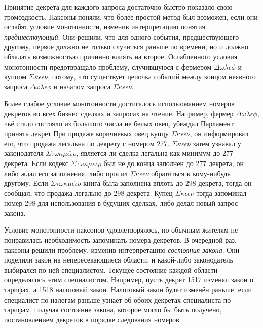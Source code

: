 \documentclass[12pt, a4paper]{article} %
\begin{document}
Принятие декрета для каждого запроса достаточно быстро показало свою громоздкость. Паксоны поняли, что более простой метод был возможен, если они ослабят условие монотонности, изменив интерпретацию понятия \textit{предшествующий}. Они решили, что для одного события, предшествующего другому, первое должно не только случиться раньше по времени, но и должно обладать возможностью причинно влиять на второе. Ослабленного условия монотонности предотвращало проблему, случившуюся с фермером $\Delta\omega\lambda\epsilon\phi$ и купцом $\Sigma\kappa\epsilon\epsilon\nu$, потому, что существует цепочка событий между концом неявного запроса $\Delta\omega\lambda\epsilon\phi$ и началом запроса $\Sigma\kappa\epsilon\epsilon\nu$. 

Более слабое условие монотонности достигалось использованием номеров декретов во всех бизнес сделках и запросах на чтение. Например, фермер $\Delta\omega\lambda\epsilon\phi$, чьё стадо состояло из большого числа не белых овец, убеждал Парламент принять декрет
При продаже коричневых овец купцу $\Sigma\kappa\epsilon\epsilon\nu$, он информировал его, что продажа легальна по декрету с номером 277. $\Sigma\kappa\epsilon\epsilon\nu$ затем узнавал у законодателя $\Sigma\tau\omega\kappa\mu\epsilon\check{\iota}\rho$, является ли сделка легальна как минимум до 277 декрета. Если кодекс $\Sigma\tau\omega\kappa\mu\epsilon\check{\iota}\rho$ был не до конца заполнен до 277 декрета, он либо ждал его заполнения, либо просил  $\Sigma\kappa\epsilon\epsilon\nu$ обратиться к кому-нибудь другому. Если  $\Sigma\tau\omega\kappa\mu\epsilon\check{\iota}\rho$ книга была заполнена вплоть до 298 декрета, тогда он сообщал, что продажа легально до 298 декрета. Купец $\Sigma\kappa\epsilon\epsilon\nu$ тогда запоминал номер 298 для использования в будущих сделках, либо делал новый запрос закона.

Условие монотонности паксонов удовлетворялось, но обычным жителям не понравилась необходимость запоминать номера декретов. В очередной раз, паксоны решили проблему, изменив интерпретацию \textit{состояния закона}. Они поделили закон на непересекающиеся области, и какой-либо законодатель выбирался по ней специалистом. Текущее состояние каждой области определялось этим специалистом. Например, пусть декрет 1517 изменял закон о тарифах, а 1518 налоговый закон. Налоговый закон будет изменён раньше, если специалист по налогам раньше узнает об обоих декретах специалиста по тарифам, получая состояние закона, которое могло бы быть получено, постановлением декретов в порядке следования номеров.
\end{document}
